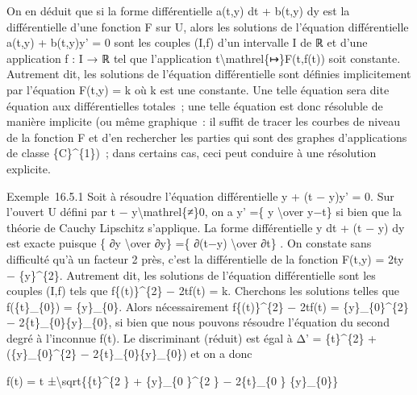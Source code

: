 \documentclass[]{article}
\begin{document}
On en déduit que si la forme différentielle a(t,y) dt + b(t,y) dy est la
différentielle d'une fonction F sur U, alors les solutions de l'équation
différentielle a(t,y) + b(t,y)y' = 0 sont les couples (I,f) d'un
intervalle I de ℝ et d'une application f : I → ℝ tel que l'application
t\textbackslash{}mathrel\{↦\}F(t,f(t)) soit constante. Autrement dit,
les solutions de l'équation différentielle sont définies implicitement
par l'équation F(t,y) = k où k est une constante. Une telle équation
sera dite équation aux différentielles totales~; une telle équation est
donc résoluble de manière implicite (ou même graphique~: il suffit de
tracer les courbes de niveau de la fonction F et d'en rechercher les
parties qui sont des graphes d'applications de classe \{C\}\^{}\{1\})~;
dans certains cas, ceci peut conduire à une résolution explicite.

Exemple~16.5.1 Soit à résoudre l'équation différentielle y + (t − y)y' =
0. Sur l'ouvert U défini par t − y\textbackslash{}mathrel\{≠\}0, on a y'
=\{ y \textbackslash{}over y−t\} si bien que la théorie de Cauchy
Lipschitz s'applique. La forme différentielle y dt + (t − y) dy est
exacte puisque \{ ∂y \textbackslash{}over ∂y\} =\{ ∂(t−y)
\textbackslash{}over ∂t\} . On constate sans difficulté qu'à un facteur
2 près, c'est la différentielle de la fonction F(t,y) = 2ty −
\{y\}\^{}\{2\}. Autrement dit, les solutions de l'équation
différentielle sont les couples (I,f) tels que f\{(t)\}\^{}\{2\} −
2tf(t) = k. Cherchons les solutions telles que f(\{t\}\_\{0\}) =
\{y\}\_\{0\}. Alors nécessairement f\{(t)\}\^{}\{2\} − 2tf(t) =
\{y\}\_\{0\}\^{}\{2\} − 2\{t\}\_\{0\}\{y\}\_\{0\}, si bien que nous
pouvons résoudre l'équation du second degré à l'inconnue f(t). Le
discriminant (réduit) est égal à Δ' = \{t\}\^{}\{2\} +
(\{y\}\_\{0\}\^{}\{2\} − 2\{t\}\_\{0\}\{y\}\_\{0\}) et on a donc

f(t) = t ±\textbackslash{}sqrt\{\{t\}\^{}\{2 \} + \{y\}\_\{0 \}\^{}\{2
\} − 2\{t\}\_\{0 \} \{y\}\_\{0\}\}
\end{document}
